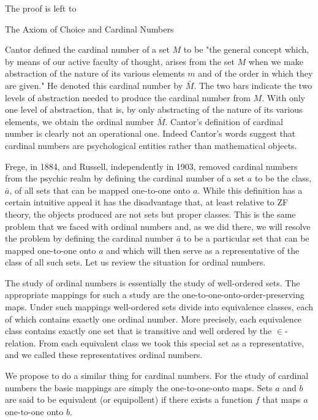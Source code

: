 The proof is left to

The Axiom of Choice and Cardinal Numbers

Cantor defined the cardinal number of a set $M$ to be "the general concept which, by means of our active faculty of thought, arises from the set $M$ when we make abstraction of the nature of its various elements $m$ and of the order in which they are given." He denoted this cardinal number by $\bar{M}$. The two bars indicate the two levels of abstraction needed to produce the cardinal number from $M$. With only one level of abstraction, that is, by only abstracting of the nature of its various elements, we obtain the ordinal number $\bar{M}$. Cantor's definition of cardinal number is clearly not an operational one. Indeed Cantor's words suggest that cardinal numbers are psychological entities rather than mathematical objects.

Frege, in 1884, and Russell, independently in 1903, removed cardinal numbers from the psychic realm by defining the cardinal number of a set $a$ to be the class, $\bar{a}$, of all sets that can be mapped one-to-one onto $a$. While this definition has a certain intuitive appeal it has the disadvantage that, at least relative to ZF theory, the objects produced are not sets but proper classes. This is the same problem that we faced with ordinal numbers and, as we did there, we will resolve the problem by defining the cardinal number $\bar{a}$ to be a particular set that can be mapped one-to-one onto $a$ and which will then serve as a representative of the class of all such sets. Let us review the situation for ordinal numbers.

The study of ordinal numbers is essentially the study of well-ordered sets. The appropriate mappings for such a study are the one-to-one-onto-order-preserving maps. Under such mappings well-ordered sets divide into equivalence classes, each of which contains exactly one ordinal number. More precisely, each equivalence class contains exactly one set that is transitive and well ordered by the $\in$-relation. From each equivalent class we took this special set as a representative, and we called these representatives ordinal numbers.

We propose to do a similar thing for cardinal numbers. For the study of cardinal numbers the basic mappings are simply the one-to-one-onto maps. Sets $a$ and $b$ are said to be equivalent (or equipollent) if there exists a function $f$ that maps $a$ one-to-one onto $b$.
